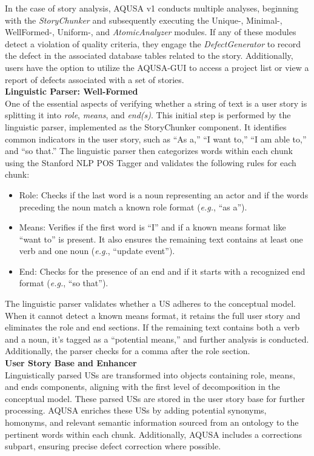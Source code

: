In the case of story analysis, AQUSA v1 conducts multiple analyses, beginning with the \emph{StoryChunker} and subsequently executing the Unique-, Minimal-, WellFormed-, Uniform-, and \emph{AtomicAnalyzer} modules. If any of these modules detect a violation of quality criteria, they engage the \emph{DefectGenerator} to record the defect in the associated database tables related to the story. Additionally, users have the option to utilize the AQUSA-GUI to access a project list or view a report of defects associated with a set of stories. \\ 
\textbf{Linguistic Parser: Well-Formed}\\ 
One of the essential aspects of verifying whether a string of text is a user story is splitting it into \emph{role}, \emph{means}, and \emph{end(s)}. This initial step is performed by the linguistic parser, implemented as the StoryChunker component. It identifies common indicators in the user story, such as \enquote{As a,} \enquote{I want to,} \enquote{I am able to,} and \enquote{so that.} The linguistic parser then categorizes words within each chunk using the Stanford NLP POS Tagger and validates the following rules for each chunk:
\begin{itemize}
\item Role: Checks if the last word is a noun representing an actor and if the words preceding the noun match a known role format (\emph{e.g.}, \enquote{as a}).
\item Means: Verifies if the first word is \enquote{I} and if a known means format like \enquote{want to} is present. It also ensures the remaining text contains at least one verb and one noun (\emph{e.g.}, \enquote{update event}).
\item End: Checks for the presence of an end and if it starts with a recognized end format (\emph{e.g.}, \enquote{so that}).
\end{itemize}
The linguistic parser validates whether a US adheres to the conceptual model. When it cannot detect a known means format, it retains the full user story and eliminates the role and end sections. If the remaining text contains both a verb and a noun, it's tagged as a \enquote{potential means,} and further analysis is conducted. Additionally, the parser checks for a comma after the role section. \\ 
\textbf{User Story Base and Enhancer}\\ 
Linguistically parsed USs are transformed into objects containing role, means, and ends components, aligning with the first level of decomposition in the conceptual model. These parsed USs are stored in the user story base for further processing. AQUSA enriches these USs by adding potential synonyms, homonyms, and relevant semantic information sourced from an ontology to the pertinent words within each chunk. Additionally, AQUSA includes a corrections subpart, ensuring precise defect correction where possible. \\ 
